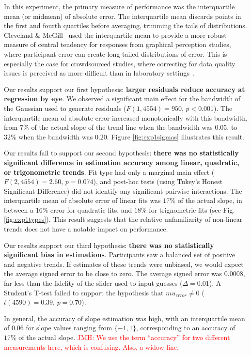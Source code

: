 \documentclass{sigchi}
\newcommand{\jeff}[1]{\textcolor{red}{JMH: #1}}
\begin{document}
In this experiment, the primary measure of performance was the interquartile mean (or midmean) of absolute error. The interquartile mean discards points in the first and fourth quartiles before averaging, trimming the tails of distributions. Cleveland \& McGill~\cite{cleveland1984graphical} used the interquartile mean to provide a more robust measure of central tendency for responses from graphical perception studies, where participant error can create long tailed distributions of error. This is especially the case for crowdsourced studies, where correcting for data quality issues is perceived as more difficult than in laboratory settings~\cite{heer2010crowdsourcing}.

Our results support our first hypothesis: \textbf{larger residuals reduce accuracy at regression by eye}.  We observed a significant main effect for the bandwidth of the Gaussian used to generate residuals ($F(1,4554)=950$, $p<0.001$). The interquartile mean of absolute error increased monotonically with this bandwidth, from $7\%$ of the actual slope of the trend line when the bandwidth was $0.05$, to $32\%$ when the bandwidth was $0.20$. Figure \ref{fig:exp1sigmas} illustrates this result.

Our results fail to support our second hypothesis: \textbf{there was no statistically significant difference in estimation accuracy among linear, quadratic, or trigonometric trends}. Fit type had only a marginal main effect ($F(2,4554)=2.60$, $p=0.074$), and post-hoc tests (using Tukey's Honest Significant Difference) did not identify any significant pairwise interactions. The interquartile mean of absolute error of linear fits was $17\%$ of the actual slope, in between a $16\%$ error for quadratic fits, and $18\%$ for trignometric fits (see Fig. \ref{fig:exp1types}). This result suggests that the relative unfamiliarity of non-linear trends does not have a notable impact on performance.

Our results support our third hypothesis: \textbf{there was no statistically significant bias in estimations}. Participants saw a balanced set of positive and negative trends. If estimates of these trends were unbiased, we would expect the average signed error to be close to zero. The average signed error was $0.0008$, far less than the fidelity of the slider used to input guesses ($\Delta=0.01$). A Student's T-test failed to support the hypothesis that $mu_{error}\ne0$ ($t(4590) = 0.39$, $p=0.70$).

In general, the accuracy of slope estimation was high, with an interquartile mean of $0.06$ for slope values ranging from $\{-1,1\}$, corresponding to an accuracy of $17\%$ of the actual slope. \jeff{We use the term ``accuracy'' for two different measurements here, which is confusing. Also, a widow line.}
\end{document}
